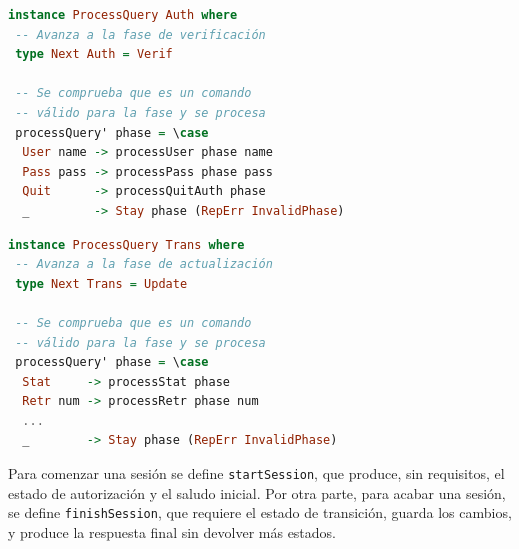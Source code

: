 \documentclass[a4paper]{CSMakotoTechnicalReport}
\begin{document}
\vspace{-16pt}
\begin{minipage}[t]{0.47\textwidth}
\begin{lstlisting}[language=Haskell, frame=none, numbers=none, basicstyle=\footnotesize]
instance ProcessQuery Auth where
 -- Avanza a la fase de verificación
 type Next Auth = Verif

 -- Se comprueba que es un comando
 -- válido para la fase y se procesa
 processQuery' phase = \case
  User name -> processUser phase name
  Pass pass -> processPass phase pass
  Quit      -> processQuitAuth phase
  _         -> Stay phase (RepErr InvalidPhase)
\end{lstlisting}
\vspace{-4pt}
\captionsetup{type=lstlisting}
\caption{Implementación de ProcessQuery por Auth.}
\end{minipage}
\hfill
\begin{minipage}[t]{0.47\textwidth}
\begin{lstlisting}[language=Haskell, frame=none, numbers=none, basicstyle=\footnotesize]
instance ProcessQuery Trans where
 -- Avanza a la fase de actualización
 type Next Trans = Update

 -- Se comprueba que es un comando
 -- válido para la fase y se procesa
 processQuery' phase = \case
  Stat     -> processStat phase
  Retr num -> processRetr phase num
  ...
  _        -> Stay phase (RepErr InvalidPhase)
\end{lstlisting}
\vspace{-4pt}
\captionsetup{type=lstlisting}
\caption{Implementación de ProcessQuery por Trans.}
\end{minipage}
\vspace{10pt}

Para comenzar una sesión se define \texttt{startSession}, que produce, sin requisitos, el estado de autorización y el saludo inicial. Por otra parte, para acabar una sesión, se define \texttt{finishSession}, que requiere el estado de transición, guarda los cambios, y produce la respuesta final sin devolver más estados.
\end{document}
